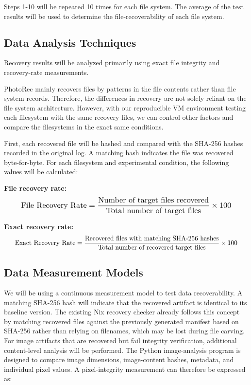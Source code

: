 \documentclass[conference]{IEEEtran}
\begin{document}
Steps 1-10 will be repeated 10 times for each file system. The average of the test results will be used to determine the file-recoverability of each file system.

\subsection {Data Analysis Techniques}

Recovery results will be analyzed primarily using exact file integrity and recovery-rate measurements.

PhotoRec mainly recovers files by patterns in the file contents rather than file system records. Therefore, the differences in recovery are not solely reliant on the file system architecture. However, with our reproducible VM environment testing each filesystem with the same recovery files, we can control other factors and compare the filesystems in the exact same conditions.

First, each recovered file will be hashed and compared with the SHA-256 hashes recorded in the original log. A matching hash indicates the file was recovered byte-for-byte. For each filesystem and experimental condition, the following values will be calculated:

\textbf{File recovery rate:}
\begin{equation}
\resizebox{0.90\columnwidth}{!}{$\displaystyle
\text{File Recovery Rate} = \frac{\text{Number of target files recovered}}{\text{Total number of target files}} \times 100
$}
\end{equation}

\textbf{Exact recovery rate:}
\begin{equation}
\resizebox{0.95\columnwidth}{!}{$\displaystyle
\text{Exact Recovery Rate} = \frac{\text{Recovered files with matching SHA-256 hashes}}{\text{Total number of recovered target files}} \times 100
$}
\end{equation}

\subsection {Data Measurement Models}

We will be using a continuous measurement model to test data recoverability. A matching SHA-256 hash will indicate that the recovered artifact is identical to its baseline version. The existing Nix recovery checker already follows this concept by matching recovered files against the previously generated manifest based on SHA-256 rather than relying on filenames, which may be lost during file carving.
For image artifacts that are recovered but fail integrity verification, additional content-level analysis will be performed. The Python image-analysis program is designed to compare image dimensions, image-content hashes, metadata, and individual pixel values. A pixel-integrity measurement can therefore be expressed as:
\end{document}

